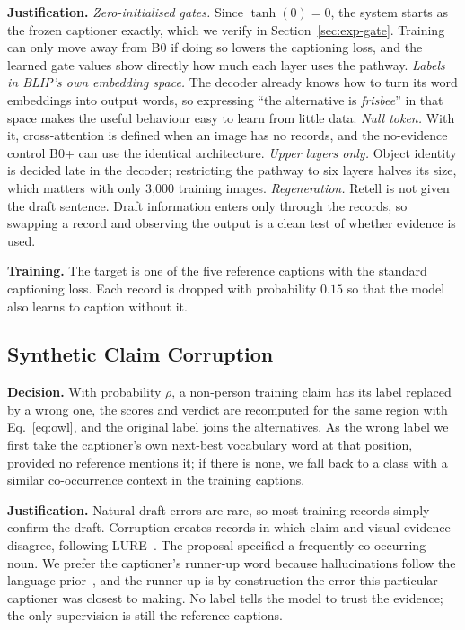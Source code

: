\textbf{Justification.} \emph{Zero-initialised gates.} Since $\tanh(0)=0$, the system starts as the frozen captioner exactly, which we verify in Section~\ref{sec:exp-gate}. Training can only move away from B0 if doing so lowers the captioning loss, and the learned gate values show directly how much each layer uses the pathway. \emph{Labels in BLIP's own embedding space.} The decoder already knows how to turn its word embeddings into output words, so expressing ``the alternative is \emph{frisbee}'' in that space makes the useful behaviour easy to learn from little data. \emph{Null token.} With it, cross-attention is defined when an image has no records, and the no-evidence control B0+ can use the identical architecture. \emph{Upper layers only.} Object identity is decided late in the decoder; restricting the pathway to six layers halves its size, which matters with only 3{,}000 training images. \emph{Regeneration.} Retell is not given the draft sentence. Draft information enters only through the records, so swapping a record and observing the output is a clean test of whether evidence is used.

\textbf{Training.} The target is one of the five reference captions with the standard captioning loss. Each record is dropped with probability $0.15$ so that the model also learns to caption without it.

\subsection{Synthetic Claim Corruption}
\textbf{Decision.} With probability $\rho$, a non-person training claim has its label replaced by a wrong one, the scores and verdict are recomputed for the same region with Eq.~\eqref{eq:owl}, and the original label joins the alternatives. As the wrong label we first take the captioner's own next-best vocabulary word at that position, provided no reference mentions it; if there is none, we fall back to a class with a similar co-occurrence context in the training captions.

\textbf{Justification.} Natural draft errors are rare, so most training records simply confirm the draft. Corruption creates records in which claim and visual evidence disagree, following LURE~\cite{zhou2024analyzing}. The proposal specified a frequently co-occurring noun. We prefer the captioner's runner-up word because hallucinations follow the language prior~\cite{rohrbach2018object}, and the runner-up is by construction the error this particular captioner was closest to making. No label tells the model to trust the evidence; the only supervision is still the reference captions.

